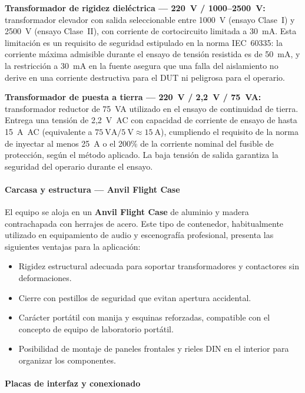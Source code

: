 \textbf{Transformador de rigidez dieléctrica — 220~V / 1000--2500~V:}
transformador elevador con salida seleccionable entre 1000~V
(ensayo Clase~I) y 2500~V (ensayo Clase~II),
con corriente de cortocircuito limitada a 30~mA.
Esta limitación es un requisito de seguridad estipulado en la
norma IEC~60335: la corriente máxima admisible durante el ensayo
de tensión resistida es de 50~mA, y la restricción a 30~mA en
la fuente asegura que una falla del aislamiento no derive en
una corriente destructiva para el DUT ni peligrosa para el operario.

\textbf{Transformador de puesta a tierra — 220~V / 2{,}2~V / 75~VA:}
transformador reductor de 75~VA utilizado en el ensayo de
continuidad de tierra.
Entrega una tensión de 2{,}2~V~AC con capacidad de corriente
de ensayo de hasta 15~A~AC (equivalente a $75~\text{VA} / 5~\text{V} \approx 15~\text{A}$),
cumpliendo el requisito de la norma de inyectar al menos 25~A
o el 200\% de la corriente nominal del fusible de protección,
según el método aplicado.
La baja tensión de salida garantiza la seguridad del operario
durante el ensayo.

\paragraph{Carcasa y estructura — Anvil Flight Case}

El equipo se aloja en un \textbf{Anvil Flight Case} de aluminio y
madera contrachapada con herrajes de acero.
Este tipo de contenedor, habitualmente utilizado en equipamiento
de audio y escenografía profesional, presenta las siguientes ventajas
para la aplicación:

\begin{itemize}
    \item Rigidez estructural adecuada para soportar transformadores
          y contactores sin deformaciones.
    \item Cierre con pestillos de seguridad que evitan apertura accidental.
    \item Carácter portátil con manija y esquinas reforzadas,
          compatible con el concepto de equipo de laboratorio portátil.
    \item Posibilidad de montaje de paneles frontales y rieles DIN
          en el interior para organizar los componentes.
\end{itemize}

\paragraph{Placas de interfaz y conexionado}

